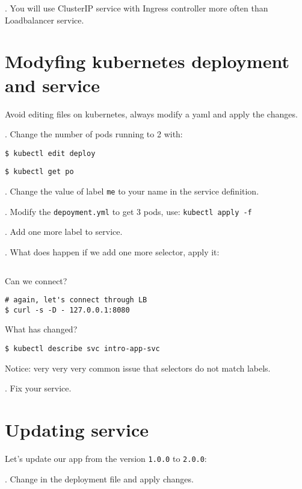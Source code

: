 \documentclass[12pt, letterpaper]{article}
\begin{document}
. You will use ClusterIP service with Ingress controller more often than Loadbalancer service.

%
\section{Modyfing kubernetes deployment and service}

Avoid editing files on kubernetes, always modify a yaml and apply the changes.

. Change the number of pods running to 2 with:

\begin{verbatim}
$ kubectl edit deploy
\end{verbatim}

\begin{verbatim}
$ kubectl get po
\end{verbatim}

. Change the value of label \verb|me| to your name in the service definition.

. Modify the \verb|depoyment.yml| to get 3 pods, use: \texttt{kubectl apply -f}

. Add one more label to service.

. What does happen if we add one more selector, apply it:

\inputminted{yaml}{manifests/exercise-broke-svc/kube-service-broke.yml}

Can we connect?

\begin{verbatim}
# again, let's connect through LB
$ curl -s -D - 127.0.0.1:8080

\end{verbatim}

What has changed?
\begin{verbatim}
$ kubectl describe svc intro-app-svc
\end{verbatim}

\bigskip
Notice: {\large very very very common issue} that selectors do not match labels.

. Fix your service.

%
%
%
\section{Updating service}

Let's update our app from the version \verb|1.0.0| to \verb|2.0.0|:

. Change in the deployment file and apply changes.
\end{document}
